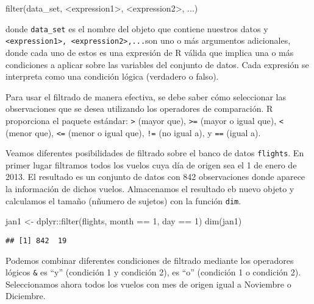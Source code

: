 \documentclass[
]{book}
\newenvironment{Shaded}{\begin{snugshade}}{\end{snugshade}}
\newcommand{\DecValTok}[1]{\textcolor[rgb]{0.00,0.00,0.81}{#1}}
\newcommand{\FunctionTok}[1]{\textcolor[rgb]{0.00,0.00,0.00}{#1}}
\newcommand{\NormalTok}[1]{#1}
\newcommand{\OtherTok}[1]{\textcolor[rgb]{0.56,0.35,0.01}{#1}}
\newcommand{\SpecialCharTok}[1]{\textcolor[rgb]{0.00,0.00,0.00}{#1}}
\begin{document}
\begin{Shaded}
\begin{Highlighting}[]
\FunctionTok{filter}\NormalTok{(data\_set, }\SpecialCharTok{\textless{}}\NormalTok{expression1}\SpecialCharTok{\textgreater{}}\NormalTok{, }\SpecialCharTok{\textless{}}\NormalTok{expression2}\SpecialCharTok{\textgreater{}}\NormalTok{, ...)}
\end{Highlighting}
\end{Shaded}

donde \texttt{data\_set} es el nombre del objeto que contiene nuestros datos y \texttt{\textless{}expression1\textgreater{},\ \textless{}expression2\textgreater{},...}son uno o más argumentos adicionales, donde cada uno de estos es una expresión de R válida que implica una o más condiciones a aplicar sobre las variables del conjunto de datos. Cada expresión se interpreta como una condición lógica (verdadero o falso).

Para usar el filtrado de manera efectiva, se debe saber cómo seleccionar las observaciones que se desea utilizando los operadores de comparación. R proporciona el paquete estándar: \texttt{\textgreater{}} (mayor que), \texttt{\textgreater{}=} (mayor o igual que), \texttt{\textless{}} (menor que), \texttt{\textless{}=} (menor o igual que), \texttt{!=} (no igual a), y \texttt{==} (igual a).

Veamos diferentes posibilidades de filtrado sobre el banco de datos \texttt{flights}. En primer lugar filtramos todos los vuelos cuya día de origen sea el 1 de enero de 2013. El resultado es un conjunto de datos con 842 observaciones donde aparece la información de dichos vuelos. Almacenamos el resultado eb nuevo objeto y calculamos el tamaño (nñumero de sujetos) con la función \texttt{dim}.

\begin{Shaded}
\begin{Highlighting}[]
\NormalTok{jan1 }\OtherTok{\textless{}{-}}\NormalTok{ dplyr}\SpecialCharTok{::}\FunctionTok{filter}\NormalTok{(flights, month }\SpecialCharTok{==} \DecValTok{1}\NormalTok{, day }\SpecialCharTok{==} \DecValTok{1}\NormalTok{)}
\FunctionTok{dim}\NormalTok{(jan1)}
\end{Highlighting}
\end{Shaded}

\begin{verbatim}
## [1] 842  19
\end{verbatim}

Podemos combinar diferentes condiciones de filtrado mediante los operadores lógicos \texttt{\&} es ``y'' (condición 1 y condición 2), \texttt{\textbar{}} es ``o'' (condición 1 o condición 2). Seleccionamos ahora todos los vuelos con mes de origen igual a Noviembre o Diciembre.
\end{document}
